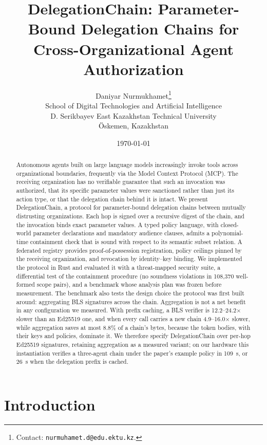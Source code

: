 \documentclass[11pt,a4paper]{article}
\title{DelegationChain: Parameter-Bound Delegation Chains for \\
       Cross-Organizational Agent Authorization}
\author{
    Daniyar Nurmukhamet\thanks{Contact: \texttt{nurmuhamet.d@edu.ektu.kz}.} \\
    School of Digital Technologies and Artificial Intelligence \\
    D. Serikbayev East Kazakhstan Technical University \\
    \"Oskemen, Kazakhstan
}
\date{\today}
\begin{document}
\maketitle

\begin{abstract}
Autonomous agents built on large language models increasingly invoke tools
across organizational boundaries, frequently via the Model Context Protocol
(MCP). The receiving organization has no verifiable guarantee that such an
invocation was authorized, that its specific parameter values were
sanctioned rather than just its action type, or that the delegation chain
behind it is intact. We present DelegationChain, a protocol for
parameter-bound delegation chains between mutually distrusting
organizations. Each hop is signed over a recursive digest of the chain, and
the invocation binds exact parameter values. A typed policy language, with
closed-world parameter declarations and mandatory audience clauses, admits a
polynomial-time containment check that is sound with respect to its semantic
subset relation. A federated registry provides proof-of-possession
registration, policy ceilings pinned by the receiving organization, and
revocation by identity--key binding. We implemented the protocol in Rust and
evaluated it with a threat-mapped security suite, a differential test of the
containment procedure (no soundness violations in 108,370 well-formed scope
pairs), and a benchmark whose analysis plan was frozen before measurement.
The benchmark also tests the design choice the protocol was first built
around: aggregating BLS signatures across the chain. Aggregation is not a
net benefit in any configuration we measured. With prefix caching, a BLS
verifier is 12.2--24.2$\times$ slower than an Ed25519 one, and when every
call carries a new chain 4.9--16.0$\times$ slower, while aggregation saves
at most 8.8\% of a chain's bytes, because the token bodies, with their keys
and policies, dominate it. We therefore specify DelegationChain over per-hop
Ed25519 signatures, retaining aggregation as a measured variant; on our
hardware this instantiation verifies a three-agent chain under the paper's
example policy in 109~\textmu{}s, or 26~\textmu{}s when the delegation
prefix is cached.
\end{abstract}

\section{Introduction}
\label{sec:introduction}
\end{document}
